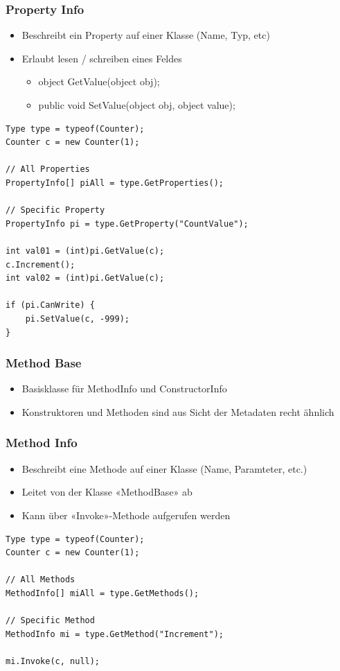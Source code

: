 \subsubsection{Property Info}
\begin{itemize}
    \item Beschreibt ein Property auf einer Klasse (Name, Typ, etc)
    \item Erlaubt lesen / schreiben eines Feldes
    \begin{itemize}
        \item object GetValue(object obj);
        \item public void SetValue(object obj, object value);
    \end{itemize}
\end{itemize}
\begin{lstlisting}
Type type = typeof(Counter);
Counter c = new Counter(1);

// All Properties
PropertyInfo[] piAll = type.GetProperties();

// Specific Property
PropertyInfo pi = type.GetProperty("CountValue");

int val01 = (int)pi.GetValue(c);
c.Increment();
int val02 = (int)pi.GetValue(c);

if (pi.CanWrite) {
    pi.SetValue(c, -999);
}
\end{lstlisting}

\subsubsection{Method Base}
\begin{itemize}
    \item Basisklasse für MethodInfo und ConstructorInfo
    \item Konstruktoren und Methoden sind aus Sicht der Metadaten recht ähnlich
\end{itemize}

\subsubsection{Method Info}
\begin{itemize}
    \item Beschreibt eine Methode auf einer Klasse (Name, Paramteter, etc.)
    \item Leitet von der Klasse «MethodBase» ab
    \item Kann über «Invoke»-Methode aufgerufen werden
\end{itemize}
\begin{lstlisting}
Type type = typeof(Counter);
Counter c = new Counter(1);

// All Methods
MethodInfo[] miAll = type.GetMethods();

// Specific Method
MethodInfo mi = type.GetMethod("Increment");

mi.Invoke(c, null);
\end{lstlisting}

